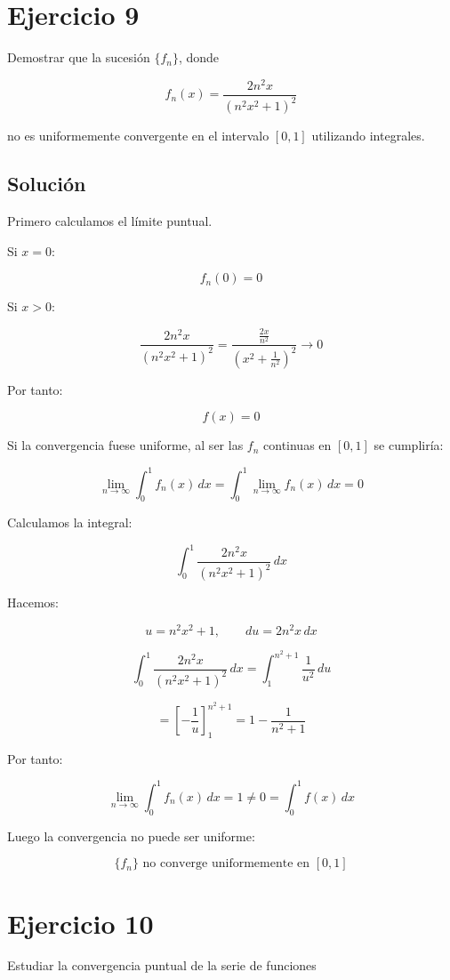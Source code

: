 \documentclass[fleqn]{article}
\begin{document}
\section{Ejercicio 9}
	Demostrar que la sucesión $\{f_n\}$, donde

	\[
	f_n(x)=\frac{2n^2x}{(n^2x^2+1)^2}
	\]

	no es uniformemente convergente en el intervalo $[0,1]$ utilizando integrales.

	\subsection{Solución}

	Primero calculamos el límite puntual.

	Si $x=0$:

	\[
	f_n(0)=0
	\]

	Si $x>0$:

	\[
	\frac{2n^2x}{(n^2x^2+1)^2}
	=
	\frac{\frac{2x}{n^2}}
	{\left(x^2+\frac{1}{n^2}\right)^2}
	\longrightarrow 0
	\]

	Por tanto:

	\[
	\boxed{
	f(x)=0
	}
	\]

	Si la convergencia fuese uniforme, al ser las $f_n$ continuas en $[0,1]$ se cumpliría:

	\[
	\lim_{n\to\infty}
	\int_0^1 f_n(x)\,dx
	=
	\int_0^1
	\lim_{n\to\infty}f_n(x)\,dx
	=
	0
	\]

	Calculamos la integral:

	\[
	\int_0^1
	\frac{2n^2x}{(n^2x^2+1)^2}\,dx
	\]

	Hacemos:

	\[
	u=n^2x^2+1,
	\qquad
	du=2n^2x\,dx
	\]

	\[
	\int_0^1
	\frac{2n^2x}{(n^2x^2+1)^2}\,dx
	=
	\int_1^{n^2+1}\frac{1}{u^2}\,du
	\]

	\[
	=
	\left[
	-\frac{1}{u}
	\right]_1^{n^2+1}
	=
	1-\frac{1}{n^2+1}
	\]

	Por tanto:

	\[
	\lim_{n\to\infty}
	\int_0^1f_n(x)\,dx
	=
	1
	\neq
	0
	=
	\int_0^1f(x)\,dx
	\]

	Luego la convergencia no puede ser uniforme:

	\[
	\boxed{
	\{f_n\}\text{ no converge uniformemente en }[0,1]
	}
	\]

\section{Ejercicio 10}
	Estudiar la convergencia puntual de la serie de funciones
\end{document}
